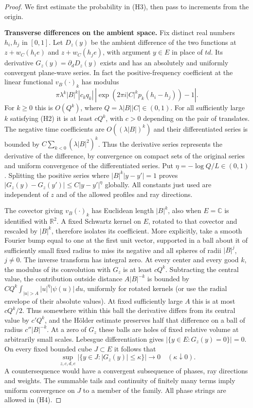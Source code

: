 \documentclass[11pt,a4paper]{article}
\begin{document}
\begin{proof}
We first estimate the probability in (H3), then pass to increments from the origin.

\par\smallskip\noindent\textbf{Transverse differences on the ambient space.}\enspace
Fix distinct real numbers $h_i,h_j$ in $[0,1]$. Let $D_z(y)$ be the
ambient difference of the two functions at $z+w_C(h_i e)$ and
$z+w_C(h_j e)$, with argument $y\in E$ in place of $td$. Its derivative
$G_z(y)=\partial_dD_z(y)$ exists and has an absolutely and uniformly
convergent plane-wave series. In fact the positive-frequency coefficient
at the linear functional $v_B(\cdot)_k$ has modulus
\[
 \pi\lambda^k |B|^k |c_k q_k|\,
 \left|\exp(2\pi i |C|^k p_k(h_i-h_j))-1\right|.
\]
For $k\ge0$ this is $O(Q^k)$, where $Q=\lambda|B||C|\in(0,1)$.
For all sufficiently large $k$ satisfying (H2) it is at least $cQ^k$,
with $c>0$ depending on the pair of translates. The negative time
coefficients are $O((\lambda |B|)^k)$ and their differentiated series
is bounded by $C\sum_{k<0}(\lambda |B|^2)^k$. Thus the derivative series
represents the derivative of the difference, by convergence on compact
sets of the original series and uniform convergence of the differentiated
series. Put $\eta=-\log Q/L\in(0,1)$. Splitting the positive series where
$|B|^k|y-y'|=1$ proves $|G_z(y)-G_z(y')|\le C|y-y'|^\eta$ globally.
All constants just used are independent of $z$ and of the allowed profiles
and ray directions.

The covector giving $v_B(\cdot)_k$ has Euclidean length $|B|^k$,
also when $E=\mathbb C$ is identified with $\mathbb R^2$. A fixed
Schwartz kernel on $E$, rotated to that covector and rescaled by $|B|^k$,
therefore isolates its coefficient. More explicitly, take a smooth
Fourier bump equal to one at the first unit vector, supported in a ball
about it of sufficiently small fixed radius to miss its negative and all
spheres of radii $|B|^j$, $j\ne0$. The inverse transform has integral
zero. At every center and every good $k$, the modulus of its convolution
with $G_z$ is at least $cQ^k$. Subtracting the central value, the
contribution outside distance $A|B|^{-k}$ is bounded by
$CQ^k\int_{|u|>A}|u|^\eta|\psi(u)|\,du$,
uniformly for rotated kernels (or use the radial envelope of their
absolute values). At fixed sufficiently large $A$ this is at most
$cQ^k/2$. Thus somewhere within this ball the derivative differs from
its central value by $c'Q^k$, and the H\"older estimate preserves half
that difference on a ball of radius $c''|B|^{-k}$. At a zero of $G_z$
these balls are holes of fixed relative volume at arbitrarily small
scales. Lebesgue differentiation gives $|\{y\in E:G_z(y)=0\}|=0$.
On every fixed bounded cube $J\subset E$ it follows that
\[
 \sup_{z,c,d,e}|\{y\in J: |G_z(y)|\le\kappa\}|\longrightarrow0
       \quad(\kappa\downarrow0).                              \tag{H4}
\]
A countersequence would have a convergent subsequence of phases, ray
directions and weights. The summable tails and continuity of finitely
many terms imply uniform convergence on $J$ to a member of the family.
All phase strings are allowed in (H4).


\end{proof}
\end{document}
